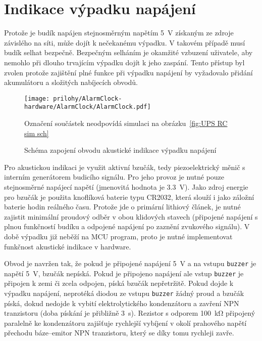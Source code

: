 \section{Indikace výpadku napájení}
Protože je budík napájen stejnosměrným napětím \SI{5}{\volt} získaným ze zdroje
závislého na síti, může dojít k nečekanému výpadku. V takovém případě musí
budík selhat bezpečně. Bezpečným selháním je okamžité vzbuzení uživatele, aby
nemohlo při dlouho trvajícím výpadku dojít k jeho zaspání. Tento přístup byl
zvolen protože zajištění plné funkce při výpadku napájení by vyžadovalo přidání
akumulátoru a složitých nabíjecích obvodů.

\begin{figure}
    \centering
    \texttt{[image: prilohy/AlarmClock-hardware/AlarmClock/AlarmClock.pdf]}
    \par\bigskip
    {\footnotesize Označení součástek neodpovídá simulaci na
    obrázku~\vref{fig:UPS RC sim sch}}
    \caption{Schéma zapojení obvodu akustické indikace výpadku napájení}
    \label{fig:UPS sch}
\end{figure}

Pro akustickou indikaci je využit aktivní bzučák, tedy piezoelektrický měnič
s interním generátorem budicího signálu. Pro jeho provoz je nutné pouze
stejnosměrné napájecí napětí (jmenovitá hodnota je \SI{3,3}{\volt}).
Jako zdroj energie pro bzučák je použita knoflíková baterie typu CR2032, která
slouží i jako záložní baterie hodin reálného času. Protože jde o primární
lithiový článek, je nutné zajistit minimální proudový odběr v obou klidových
stavech (připojené napájení s plnou funkčností budíku a odpojené napájení po
zaznění zvukového signálu). V době výpadku již neběží na MCU program, proto je
nutné implementovat funkčnost akustické indikace v hardware.

Obvod je navržen tak, že pokud je připojené napájení \SI{5}{\volt} a na vstupu
\texttt{buzzer} je napětí \SI{5}{\volt}, bzučák nepíská. Pokud je připojeno
napájení ale vstup \texttt{buzzer} je připojen k zemi či zcela odpojen, píská
bzučák nepřetržitě. Pokud dojde k výpadku napájení, neprotéká diodou ze vstupu
\texttt{buzzer} žádný proud a bzučák píská, dokud nedojde k vybití
elektrolytického kondenzátoru a zavření NPN tranzistoru (doba pískání je
přibližně \SI{3}{\second}). Rezistor s odporem \SI{100}{\kilo\ohm} připojený
paralelně ke kondenzátoru zajišťuje rychlejší vybíjení v okolí prahového napětí
přechodu báze--emitor NPN tranzistoru, který se díky tomu rychleji zavře.

